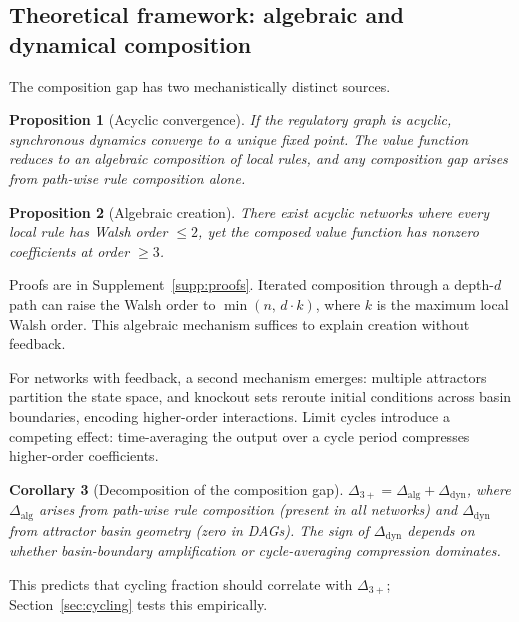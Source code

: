 \documentclass[10pt]{article}
\newtheorem{proposition}{Proposition}
\newtheorem{corollary}[proposition]{Corollary}
\begin{document}
\subsection{Theoretical framework: algebraic and dynamical composition}
\label{sec:theory}

The composition gap has two mechanistically distinct sources.

\begin{proposition}[Acyclic convergence]
\label{prop:dag}
If the regulatory graph is acyclic, synchronous dynamics converge to
a unique fixed point. The value function reduces to an algebraic
composition of local rules, and any composition gap arises from
path-wise rule composition alone.
\end{proposition}

\begin{proposition}[Algebraic creation]
\label{prop:creation}
There exist acyclic networks where every local rule has Walsh order
$\leq 2$, yet the composed value function has nonzero coefficients at
order $\geq 3$.
\end{proposition}

Proofs are in Supplement~\ref{supp:proofs}. Iterated composition
through a depth-$d$ path can raise the Walsh order to
$\min(n,\, d \cdot k)$, where $k$ is the maximum local Walsh order.
This algebraic mechanism suffices to explain creation without
feedback.

For networks with feedback, a second mechanism emerges: multiple
attractors partition the state space, and knockout sets reroute
initial conditions across basin boundaries, encoding higher-order
interactions. Limit cycles introduce a competing effect:
time-averaging the output over a cycle period compresses higher-order
coefficients.

\begin{corollary}[Decomposition of the composition gap]
\label{cor:decomposition}
$\Delta_{3+} = \Delta_{\mathrm{alg}} + \Delta_{\mathrm{dyn}}$,
where $\Delta_{\mathrm{alg}}$ arises from path-wise rule composition
(present in all networks) and $\Delta_{\mathrm{dyn}}$ from attractor
basin geometry (zero in DAGs). The sign of
$\Delta_{\mathrm{dyn}}$ depends on whether basin-boundary
amplification or cycle-averaging compression dominates.
\end{corollary}

This predicts that cycling fraction should correlate with
$\Delta_{3+}$; Section~\ref{sec:cycling} tests this empirically.
\end{document}
